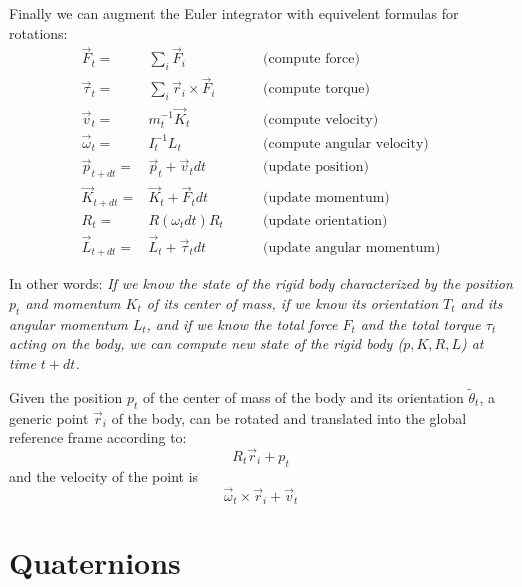 \documentclass[12pt]{article}
\begin{document}
Finally we can augment the Euler integrator with equivelent formulas for rotations:
\begin{eqnarray}
\vec F_t =& \sum_i \vec F_i & \qquad \textrm{(compute force)} \\
\vec \tau_t =& \sum_i \vec r_i \times \vec F_i & \qquad \textrm{(compute torque)}\\
\vec v_{t} =& m_t^{-1}\vec K_{t} & \qquad \textrm{(compute velocity)}\\
\vec \omega_t =& I_t^{-1} L_t & \qquad \textrm{(compute angular velocity)}\\
\vec p_{t+dt} =& \vec p_t + \vec v_t dt & \qquad \textrm{(update position)}\\
\vec K_{t+dt} =& \vec K_t + \vec F_t dt & \qquad \textrm{(update momentum)}\\
R_t = & R(\omega_t dt) R_t & \qquad \textrm{(update orientation)}\\
\vec L_{t+dt} =& \vec L_t + \vec \tau_t dt & \qquad \textrm{(update angular momentum)}
\label{euler22}
\end{eqnarray}

In other words: {\it If we know the state of the rigid body characterized by the position $p_t$ and momentum $K_t$ of its center of mass, if we know its orientation $T_t$ and its angular momentum $L_t$, and if we know the total force $F_t$ and the total torque $\tau_t$ acting on the body, we can compute new state of the rigid body ($p,K,R,L$) at time $t+dt$.}

Given the position $p_t$ of the center of mass of the body and its orientation $\tilde \theta_t$, a generic point $\vec r_i$ of the body, can be rotated and translated into the global reference frame according to:
\begin{equation}
R_t \vec r_i + p_t
\end{equation}
and the velocity of the point is
\begin{equation}
\vec \omega_t \times \vec r_i + \vec v_t
\end{equation}


\section{Quaternions}
\end{document}
